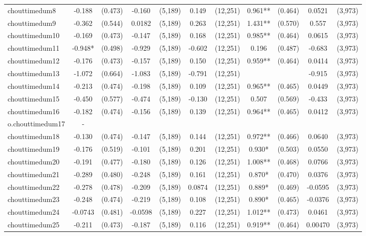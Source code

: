 \documentclass[]{article}
\begin{document}
\begin{tabular}{lcccccccccc}
chouttimedum8 & -0.188 & (0.473) & -0.160 & (5,189) & 0.149 & (12,251) & 0.961** & (0.464) & 0.0521 & (3,973) \\
chouttimedum9 & -0.362 & (0.544) & 0.0182 & (5,189) & 0.263 & (12,251) & 1.431** & (0.570) & 0.557 & (3,973) \\
chouttimedum10 & -0.169 & (0.473) & -0.147 & (5,189) & 0.168 & (12,251) & 0.985** & (0.464) & 0.0615 & (3,973) \\
chouttimedum11 & -0.948* & (0.498) & -0.929 & (5,189) & -0.602 & (12,251) & 0.196 & (0.487) & -0.683 & (3,973) \\
chouttimedum12 & -0.176 & (0.473) & -0.157 & (5,189) & 0.150 & (12,251) & 0.959** & (0.464) & 0.0414 & (3,973) \\
chouttimedum13 & -1.072 & (0.664) & -1.083 & (5,189) & -0.791 & (12,251) &  &  & -0.915 & (3,973) \\
chouttimedum14 & -0.213 & (0.474) & -0.198 & (5,189) & 0.109 & (12,251) & 0.965** & (0.465) & 0.0449 & (3,973) \\
chouttimedum15 & -0.450 & (0.577) & -0.474 & (5,189) & -0.130 & (12,251) & 0.507 & (0.569) & -0.433 & (3,973) \\
chouttimedum16 & -0.182 & (0.474) & -0.156 & (5,189) & 0.139 & (12,251) & 0.964** & (0.465) & 0.0412 & (3,973) \\
o.chouttimedum17 & - &  &  &  &  &  &  &  &  &  \\
chouttimedum18 & -0.130 & (0.474) & -0.147 & (5,189) & 0.144 & (12,251) & 0.972** & (0.466) & 0.0640 & (3,973) \\
chouttimedum19 & -0.176 & (0.519) & -0.101 & (5,189) & 0.201 & (12,251) & 0.930* & (0.503) & 0.0550 & (3,973) \\
chouttimedum20 & -0.191 & (0.477) & -0.180 & (5,189) & 0.126 & (12,251) & 1.008** & (0.468) & 0.0766 & (3,973) \\
chouttimedum21 & -0.289 & (0.480) & -0.248 & (5,189) & 0.161 & (12,251) & 0.870* & (0.470) & 0.0376 & (3,973) \\
chouttimedum22 & -0.278 & (0.478) & -0.209 & (5,189) & 0.0874 & (12,251) & 0.889* & (0.469) & -0.0595 & (3,973) \\
chouttimedum23 & -0.248 & (0.474) & -0.219 & (5,189) & 0.108 & (12,251) & 0.890* & (0.465) & -0.0376 & (3,973) \\
chouttimedum24 & -0.0743 & (0.481) & -0.0598 & (5,189) & 0.227 & (12,251) & 1.012** & (0.473) & 0.0461 & (3,973) \\
chouttimedum25 & -0.211 & (0.473) & -0.187 & (5,189) & 0.116 & (12,251) & 0.919** & (0.464) & 0.00470 & (3,973) \\

\end{tabular}
\end{document}
